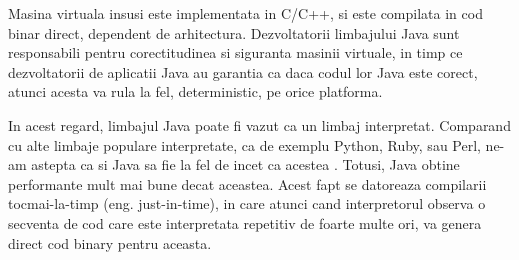 Masina virtuala insusi este implementata in C/C++, si este compilata in
cod binar direct, dependent de arhitectura. Dezvoltatorii limbajului
Java sunt responsabili pentru corectitudinea si siguranta masinii
virtuale, in timp ce dezvoltatorii de aplicatii Java au garantia ca daca
codul lor Java este corect, atunci acesta va rula la fel, deterministic,
pe orice platforma.

In acest regard, limbajul Java poate fi vazut ca un limbaj interpretat.
Comparand cu alte limbaje populare interpretate, ca de exemplu Python,
Ruby, sau Perl, ne-am astepta ca si Java sa fie la fel de incet ca
acestea \cite{language_benchmarks}. Totusi, Java obtine performante mult mai bune decat
aceastea. Acest fapt se datoreaza compilarii tocmai-la-timp (eng.
just-in-time), in care atunci cand interpretorul observa o secventa de
cod care este interpretata repetitiv de foarte multe ori, va genera
direct cod binary pentru aceasta.
